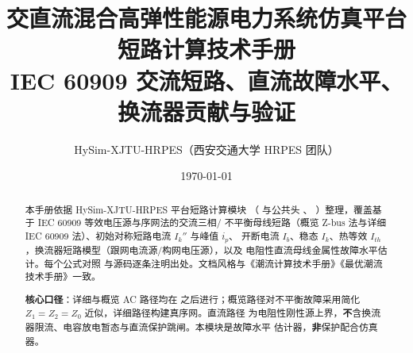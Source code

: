 \documentclass[UTF8,fontset=fandol,a4paper,11pt]{ctexart}
\title{\textbf{交直流混合高弹性能源电力系统仿真平台}\\[0.5em]
       {\Large 短路计算技术手册}\\[0.3em]
       {\large IEC 60909 交流短路、直流故障水平、换流器贡献与验证}}
\author{HySim-XJTU-HRPES（西安交通大学 HRPES 团队）}
\date{\today}
\begin{document}
\maketitle
\begin{abstract}
\noindent 本手册依据 HySim-XJTU-HRPES 平台短路计算模块
（ 与公共头 、
）整理，覆盖基于 IEC 60909 等效电压源与序网法的交流三相/
不平衡母线短路（概览 Z-bus 法与详细 IEC 60909 法）、初始对称短路电流 $I_k''$ 与峰值 $i_p$、
开断电流 $I_b$、稳态 $I_k$、热等效 $I_{th}$，换流器短路模型（跟网电流源/构网电压源），以及
电阻性直流母线金属性故障水平估计。每个公式对照 
与源码逐条注明出处。文档风格与《潮流计算技术手册》《最优潮流技术手册》一致。

\smallskip
\noindent\textbf{核心口径}：详细与概览 AC 路径均在 
之后进行；概览路径对不平衡故障采用简化 $Z_1{=}Z_2{=}Z_0$ 近似，详细路径构建真序网。直流路径
为电阻性刚性源上界，\textbf{不}含换流器限流、电容放电暂态与直流保护跳闸。本模块是故障水平
估计器，\textbf{非}保护配合仿真器。
\end{abstract}

\tableofcontents
\newpage










\end{document}
